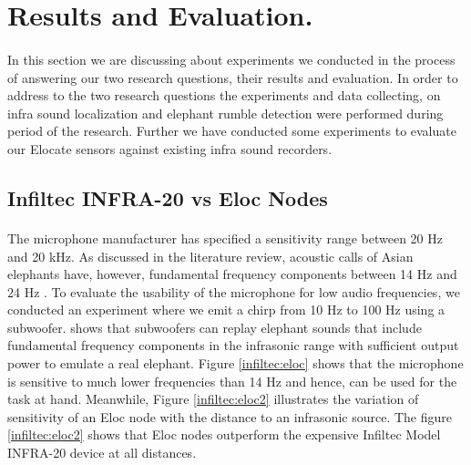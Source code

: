 \documentclass[12pt]{article}
\numberwithin{figure}{section}
\numberwithin{table}{section}
\begin{document}
\newpage
\section{Results and Evaluation.}
\paragraph{}
In this section we are discussing about experiments we conducted in the process of answering our two research questions, their results and evaluation. In order to address to the two research questions the experiments and data collecting, on infra sound localization and elephant rumble detection were performed during period of the research. Further we have conducted some experiments to evaluate our Elocate sensors against existing infra sound recorders.

\subsection{Infiltec INFRA-20 vs Eloc Nodes}
\paragraph{}
The microphone manufacturer has specified a sensitivity range between 20 Hz and 20 kHz. As discussed in the literature review, acoustic calls of Asian elephants have, however, fundamental frequency components between 14 Hz and 24 Hz \cite{30}. To evaluate the usability of the microphone for low audio frequencies, we conducted an experiment where we emit a chirp from 10 Hz to 100 Hz using a subwoofer. \cite{30} shows that subwoofers can replay elephant sounds that include fundamental frequency components in the infrasonic range with sufficient output power to emulate a real elephant. Figure \ref{infiltec:eloc} shows that the microphone is sensitive to much lower frequencies than 14 Hz and hence, can be used for the task at hand. Meanwhile, Figure \ref{infiltec:eloc2} illustrates the variation of sensitivity of an Eloc node with the distance to an infrasonic source. The figure \ref{infiltec:eloc2} shows that Eloc nodes outperform the expensive Infiltec Model INFRA-20 device at all distances.
\end{document}

